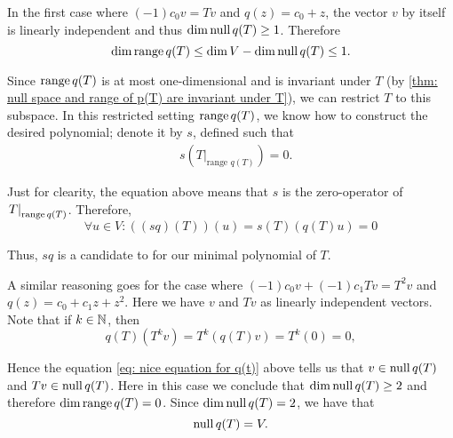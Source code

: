 \begin{prf}
  In the first case where $(-1)c_0v=Tv$ and $q(z)=c_0+z$, the vector $v$ by itself is linearly independent and thus $\dim \operatorname{null} q(T) \geq 1$.  Therefore
  \begin{equation}
    \dim \operatorname{range} q(T) \leq \dim V - \dim \operatorname{null} q(T) \leq 1.
  \end{equation}

  Since $\operatorname{range} q(T)$ is at most one-dimensional and is invariant under $T$ (by \ref{thm: null space and range of p(T) are invariant under T}), we can restrict $T$ to this subspace. In this restricted setting $\operatorname{range} q(T)$, we know how to construct the desired polynomial; denote it by $s$, defined such that
  \begin{equation}
    \begin{aligned}
        &s \left(\left. T \right |_{\text{range $q(T)$}} \right)=0.
    \end{aligned}
  \end{equation}

  Just for clearity, the equation above means that $s$ is the zero-operator of $\left. T \right |_{\operatorname{range} q(T)}$. Therefore,
  \begin{equation}
    \forall u \in V: \left((sq)(T)\right)(u) = s(T)(q(T)u)=0
  \end{equation}

  Thus, $sq$ is a candidate to for our minimal polynomial of $T$.

  A similar reasoning goes for the case where $(-1)c_0v+(-1)c_1Tv=T^2v$ and $q(z) = c_0+c_1z+z^2.$
  Here we have $v$ and $Tv$ as linearly independent vectors. Note that if $k \in \mathbb{N}$, then
  \begin{equation}
    \label{eq: nice equation for q(t)}
    q(T)(T^kv)=T^k(q(T)v) =T^k (0) =0,
  \end{equation}

  Hence the equation \eqref{eq: nice equation for q(t)} above tells us that $v\in \operatorname{null} q(T)$ and $Tv \in \operatorname{null} q(T)$. Here in this case we conclude that $\dim \operatorname{null} q(T) \geq 2$ and therefore $\dim \operatorname{range} q(T) = 0$.   Since $\dim \operatorname{null} q(T) = 2$, we have that
  \begin{equation}
    \operatorname{null} q(T) = V.
  \end{equation}


\end{prf}
